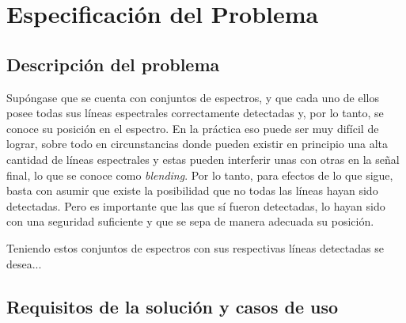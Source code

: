 \chapter{Especificación del Problema}


\section{Descripción del problema}


Supóngase que se cuenta con conjuntos de espectros, y que cada uno de ellos posee todas sus líneas espectrales correctamente detectadas y, por lo tanto, se conoce su posición en el espectro. En la práctica eso puede ser muy difícil de lograr, sobre todo en circunstancias donde pueden existir en principio una alta cantidad de líneas espectrales y estas pueden interferir unas con otras en la señal final, lo que se conoce como \textit{blending}. Por lo tanto, para efectos de lo que sigue, basta con asumir que existe la posibilidad que no todas las líneas hayan sido detectadas. Pero es importante que las que sí fueron detectadas, lo hayan sido con una seguridad suficiente y que se sepa de manera adecuada su posición.

Teniendo estos conjuntos de espectros con sus respectivas líneas detectadas se desea... 


\section{Requisitos de la solución y casos de uso}


